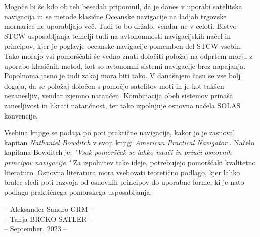 \documentclass[10pt,twosided]{book}
\theoremstyle{definition}
\begin{document}
Mogoče bi še kdo ob teh besedah pripomnil, da je danes v uporabi satelitska navigacija in se metode klasične Oceanske navigacije na ladjah trgovske mornarice ne uporabljajo več. Tudi to bo držalo, vendar ne v celoti. Bistvo STCW usposabljanja \cite{cfd_ferziger_peric} temelji tudi na avtonomnosti navigacijskih načel in principov, kjer je poglavje oceanske navigacije pomemben del STCW vsebin. Tako morajo vsi pomorščaki še vedno znati določiti položaj na odprtem morju z uporabo klasičnih metod, kot so avtonomni sistemi navigacije brez napajanja. Popolnoma jasno je tudi zakaj mora biti tako. V današnjem času se vse bolj dogaja, da se položaj določen s pomočjo satelitov moti in je kot takšen nezanesljiv, vendar izjemno natančen. Kombinacija obeh sistemov prinaša zanesljivost in hkrati natančnost, ter tako izpolnjuje osnovna načela SOLAS konvencije.

Vsebina knjige se podaja po poti praktične navigacije, kakor jo je zasnoval kapitan \textit{Nathaniel
Bowditch} v svoji knjigi \textit{American Practical Navigator} \cite{cfd_ferziger_peric}. Načelo kapitana Bowditch je: \textit{"Vsak pomorščak se lahko nauči in priuči osnovnih principov navigacije."} Za izpolnitev take ideje, potrebujejo pomorščaki kvalitetno literaturo. Osnovna literatura mora vsebovati teoretično podlago, kjer lahko bralec sledi poti razvoja od osnovnih principov do uporabne forme, ki je nato podlaga praktičnega pomorskega usposabljanja.

\vspace{2mm}
\begin{flushright}
	-- Aleksander Sandro GRM --\\[2mm]
	-- Tanja BRCKO SATLER --\\[2mm]
	-- September, 2023 --
\end{flushright}  
\clearpage
~
\newpage
\pagestyle{fancy}
\setcounter{page}{1}



\newpage


\newpage


\newpage


\newpage


\newpage



\newpage



\end{document}
